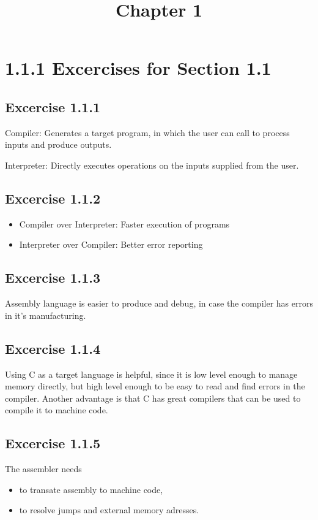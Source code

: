 \documentclass{article}
\title{Chapter 1}
\begin{document}
\date{}
\author{}

\maketitle

\section*{1.1.1 Excercises for Section 1.1}

\subsection*{Excercise 1.1.1}
Compiler: Generates a target program, in which the user can call to process inputs and produce outputs.

Interpreter: Directly executes operations on the inputs supplied from the user.

\subsection*{Excercise 1.1.2}

\begin{itemize}
    \item Compiler over Interpreter: Faster execution of programs
    \item Interpreter over Compiler: Better error reporting 
\end{itemize}

\subsection*{Excercise 1.1.3}
Assembly language is easier to produce and debug, in case the compiler has errors in it's manufacturing.

\subsection*{Excercise 1.1.4}
Using C as a target language is helpful, since it is low level enough to manage memory directly, but high level enough to be easy to read and find errors in the compiler. Another advantage is that C has great compilers that can be used to compile it to machine code.

\subsection*{Excercise 1.1.5}
The assembler needs 
\begin{itemize}
    \item to transate assembly to machine code,
    \item to resolve jumps and external memory adresses.
\end{itemize}
\end{document}

